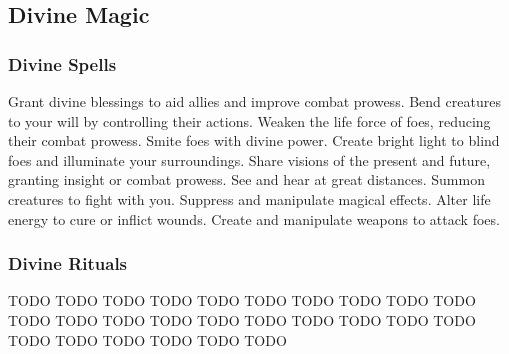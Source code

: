 \small
\subsection{Divine Magic}\label{Divine Magic}
\subsubsection{Divine Spells}\label{Divine Spells}
\begin{spelllist}
 Grant divine blessings to aid allies and improve combat prowess.
 Bend creatures to your will by controlling their actions.
 Weaken the life force of foes, reducing their combat prowess.
 Smite foes with divine power.
 Create bright light to blind foes and illuminate your surroundings.
 Share visions of the present and future, granting insight or combat prowess.
 See and hear at great distances.
 Summon creatures to fight with you.
 Suppress and manipulate magical effects.
 Alter life energy to cure or inflict wounds.
 Create and manipulate weapons to attack foes.
\end{spelllist}
\subsubsection{Divine Rituals}\label{Divine Rituals}
\begin{spelllist}
 TODO
 TODO
 TODO
 TODO
 TODO
 TODO
 TODO
 TODO
 TODO
 TODO
 TODO
 TODO
 TODO
 TODO
 TODO
 TODO
 TODO
 TODO
 TODO
 TODO
 TODO
 TODO
 TODO
 TODO
 TODO
 TODO
\end{spelllist}




\small
